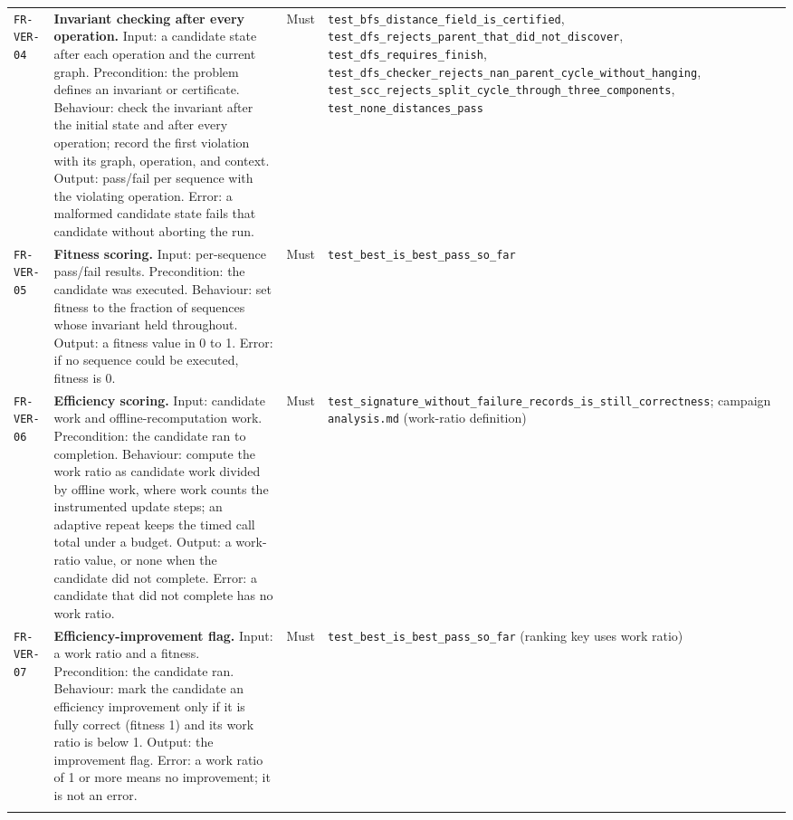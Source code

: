 \begin{longtable}{@{}>{\raggedright\arraybackslash}p{}>{\raggedright\arraybackslash}p{}p{}>{\raggedright\arraybackslash}p{}@{}}
\texttt{FR-VER-04} & \textbf{Invariant checking after every operation.} Input: a
candidate state after each operation and the current graph. Precondition: the
problem defines an invariant or certificate. Behaviour: check the invariant after
the initial state and after every operation; record the first violation with its
graph, operation, and context. Output: pass/fail per sequence with the violating
operation. Error: a malformed candidate state fails that candidate without
aborting the run. & Must & \texttt{test\_bfs\_distance\_field\_is\_certified},
\texttt{test\_dfs\_rejects\_parent\_that\_did\_not\_discover},
\texttt{test\_dfs\_requires\_finish},
\texttt{test\_dfs\_checker\_rejects\_nan\_parent\_cycle\_without\_hanging},
\texttt{test\_scc\_rejects\_split\_cycle\_through\_three\_components},
\texttt{test\_none\_distances\_pass} \\
\addlinespace[2pt]

\texttt{FR-VER-05} & \textbf{Fitness scoring.} Input: per-sequence pass/fail
results. Precondition: the candidate was executed. Behaviour: set fitness to the
fraction of sequences whose invariant held throughout. Output: a fitness value in
0 to 1. Error: if no sequence could be executed, fitness is 0. & Must &
\texttt{test\_best\_is\_best\_pass\_so\_far} \\
\addlinespace[2pt]

\texttt{FR-VER-06} & \textbf{Efficiency scoring.} Input: candidate work and
offline-recomputation work. Precondition: the candidate ran to completion.
Behaviour: compute the work ratio as candidate work divided by offline work, where
work counts the instrumented update steps; an adaptive repeat keeps the timed call
total under a budget. Output: a work-ratio value, or none when the candidate did
not complete. Error: a candidate that did not complete has no work ratio. & Must &
\texttt{test\_signature\_without\_failure\_records\_is\_still\_correctness};
campaign \texttt{analysis.md} (work-ratio definition) \\
\addlinespace[2pt]

\texttt{FR-VER-07} & \textbf{Efficiency-improvement flag.} Input: a work ratio
and a fitness. Precondition: the candidate ran. Behaviour: mark the candidate an
efficiency improvement only if it is fully correct (fitness 1) and its work ratio
is below 1. Output: the improvement flag. Error: a work ratio of 1 or more means
no improvement; it is not an error. & Must &
\texttt{test\_best\_is\_best\_pass\_so\_far} (ranking key uses work ratio) \\
\addlinespace[2pt]


\end{longtable}

